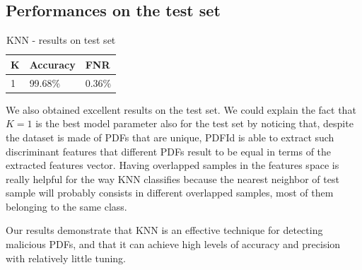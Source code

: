 \documentclass[twocolumn, switch]{article} %
\begin{document}
\subsection{Performances on the test set}
\begin{table}[ht!]
	\centering
	\begin{tabular}{|l|l|l|}
		\hline
		\textbf{K} & \textbf{Accuracy} & \textbf{FNR} \\ \hline
		1          & 99.68\%           & 0.36\%       \\ \hline
	\end{tabular}
	\caption{KNN - results on test set}
\end{table}
We also obtained excellent results on the test set. We could explain the fact that $K=1$ is the best model parameter also for the test set by noticing that, despite the dataset is made of PDFs that are unique, PDFId is able to extract such discriminant features that different PDFs result to be equal in terms of the extracted features vector. Having overlapped samples in the features space is really helpful for the way KNN classifies because the nearest neighbor of test sample will probably consists in different overlapped samples, most of them belonging to the same class.

Our results demonstrate that KNN is an effective technique for detecting malicious PDFs, and that it can achieve high levels of accuracy and precision with relatively little tuning.

\end{document}
